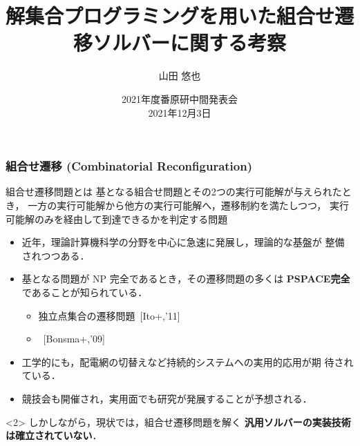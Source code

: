 \documentclass[dvipdfmx,11pt]{beamer}
\title{解集合プログラミングを用いた組合せ遷移ソルバーに関する考察}
\author{山田 悠也}
\date{2021年度番原研中間発表会\\2021年12月3日}
\institute{番原研究室}
\begin{document}
\maketitle
\begin{frame}
  \frametitle{組合せ遷移 (Combinatorial Reconfiguration)}
  \begin{alertblock}{組合せ遷移問題とは}
    基となる組合せ問題とその2つの実行可能解が与えられたとき，
    一方の実行可能解から他方の実行可能解へ，遷移制約を満たしつつ，
    実行可能解のみを経由して到達できるかを判定する問題
  \end{alertblock}

  \begin{itemize}
  \item 近年，理論計算機科学の分野を中心に急速に発展し，理論的な基盤が
    整備されつつある\footnotemark[1]．
  \item 基となる問題が NP 完全であるとき，その遷移問題の多くは
    \alert{\bf PSPACE完全}であることが知られている．
    \begin{itemize}
    \item 独立点集合の遷移問題~[Ito+,'11]
    \item {}~[Bonsma+,'09]
    \end{itemize}
  \item 工学的にも，配電網の切替えなど持続的システムへの実用的応用が期
    待されている．
  \item 競技会も開催され，実用面でも研究が発展することが予想される．
  \end{itemize}

  \begin{alertblock}<2>{}\centering
    しかしながら，現状では，組合せ遷移問題を解く
    \alert{\bf 汎用ソルバーの実装技術は確立されていない}．
  \end{alertblock}

\end{frame}
\end{document}
